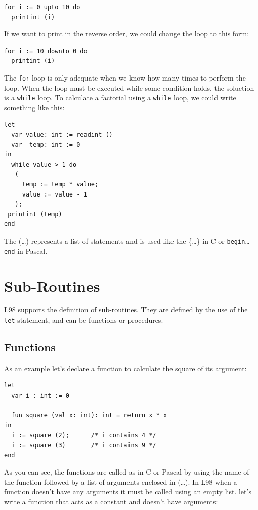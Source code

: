 \documentclass[a4paper, 11pt]{report}
\newcommand{\keyword}[1]{\texttt{#1}}
\begin{document}
\begin{lstlisting}
for i := 0 upto 10 do
  printint (i)
\end{lstlisting}

If we want to print in the reverse order, we could change the loop to
this form:
\begin{lstlisting}
for i := 10 downto 0 do
  printint (i)
\end{lstlisting}

The \keyword{for} loop is only adequate when we know how many
times to perform the loop. When the loop must be executed while some
condition holds, the soluction is a \keyword{while} loop. To calculate
a factorial using a \keyword{while} loop, we could write something like
this:

\begin{lstlisting}
let
  var value: int := readint ()
  var  temp: int := 0
in
  while value > 1 do
   (
     temp := temp * value;
     value := value - 1
   );
 printint (temp)
end
\end{lstlisting}

The (\dots) represents a list of statements and is used like the \{\dots\} in C
or \keyword{begin}\dots\keyword{end} in Pascal.


\section{Sub-Routines}
L98 supports the definition of sub-routines. They are defined by the use of
the \keyword{let} statement, and can be functions or procedures.

\subsection{Functions}
As an example let's declare a function to calculate the square of its argument:

\begin{lstlisting}
let
  var i : int := 0

  fun square (val x: int): int = return x * x
in
  i := square (2);      /* i contains 4 */
  i := square (3)       /* i contains 9 */ 
end
\end{lstlisting}

As you can see, the functions are called as in C or Pascal by using the
name of the function followed by a list of arguments enclosed in (\dots). In
L98 when a function doesn't have any arguments it must be called using an
empty list. let's write a function that acts as a constant and doesn't have
arguments:
\end{document}
